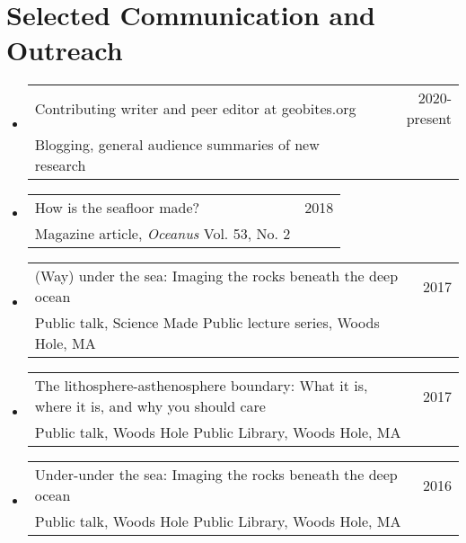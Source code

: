 \documentclass[letterpaper,11pt]{article}
\makeatletter
\newcommand{\resumeComms}[4]{
  \vspace{-2pt}\item
    \begin{tabular*}{0.97\textwidth}[t]{l@{\extracolsep{\fill}}r}
      #1 & #2 \\
      \small#3, \small#4 \\
    \end{tabular*}\vspace{-7pt}
}
\newcommand{\resumeSubHeadingListStart}{\begin{itemize}[leftmargin=0.15in, label={}]}
\newcommand{\resumeSubHeadingListEnd}{\end{itemize}}
\makeatother
\begin{document}
\section{Selected Communication and Outreach}
    \resumeSubHeadingListStart
    \resumeComms
    {Contributing writer and peer editor at geobites.org}{2020-present}
    {Blogging}{general audience summaries of new research}
    \resumeComms
    {How is the seafloor made?}{2018}
    {Magazine article}{\textit{Oceanus} Vol. 53, No. 2}
    \resumeComms
    {(Way) under the sea: Imaging the rocks beneath the deep ocean}{2017}
    {Public talk}{Science Made Public lecture series, Woods Hole, MA}
    \resumeComms
    {The lithosphere-asthenosphere boundary: What it is, where it is, and why you should care}{2017}
    {Public talk}{Woods Hole Public Library, Woods Hole, MA}
    \resumeComms
    {Under-under the sea: Imaging the rocks beneath the deep ocean}{2016}
    {Public talk}{Woods Hole Public Library, Woods Hole, MA}
    \resumeSubHeadingListEnd


\end{document}
